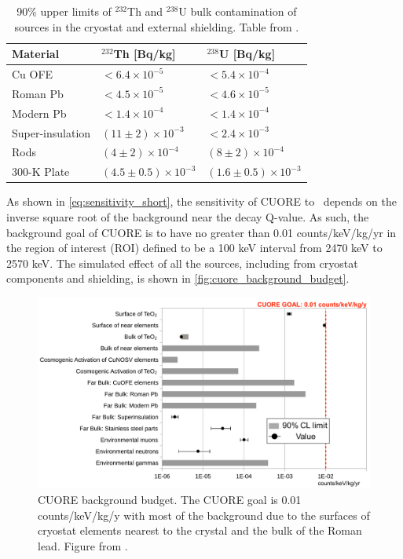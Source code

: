 \begin{table}[htbp]
\centering
\caption[90\% upper limits of $^{232}$Th and $^{238}$U bulk contamination of sources in the cryostat and external shielding]
{90\% upper limits of $^{232}$Th and $^{238}$U bulk contamination of sources in the cryostat and external shielding.
Table from \cite{Alduino:2017qet}.}
\label{tab:FarDetectorSources_Bulk}
\begin{tabular}{lll}
\hline
\hline
Material         & $^{232}$Th [Bq/kg]         & $^{238}$U [Bq/kg]    \\
\hline
Cu OFE             & $<6.4\times10^{-5}$ & $<5.4\times10^{-4}$      \\
Roman Pb            & $<4.5\times10^{-5}$ & $<4.6\times10^{-5}$      \\
Modern Pb            & $<1.4\times10^{-4}$ & $<1.4\times10^{-4}$      \\
Super-insulation  & $(11\pm2)\times10^{-3}$ & $<2.4\times10^{-3}$      \\
Rods  & $(4\pm2)\times10^{-4}$ & $(8\pm2)\times10^{-4}$      \\
300-K Plate & $(4.5\pm0.5)\times10^{-3}$ & $(1.6\pm0.5)\times10^{-3}$      \\
\hline
\hline
\end{tabular}
\end{table}

As shown in \autoref{eq:sensitivity_short}, the sensitivity of CUORE to \zeronubb~depends on the inverse square root of the background near the decay Q-value.
As such, the background goal of CUORE is to have no greater than 0.01 counts/keV/kg/yr in the region of interest (ROI) defined to be a 100 keV interval from 2470 keV to 2570 keV.
The simulated effect of all the sources, including from cryostat components and shielding, is shown in \autoref{fig:cuore_background_budget}.

\begin{figure}[htbp]
\centering
\includegraphics[width=0.8\linewidth]{Figures/CUORE_background_budget}
\caption[CUORE background budget]
{CUORE background budget.
The CUORE goal is 0.01 counts/keV/kg/y with most of the background due to the surfaces of cryostat elements nearest to the crystal and the bulk of the Roman lead.
Figure from \cite{Alduino:2017qet}.}
\label{fig:cuore_background_budget}
\end{figure}